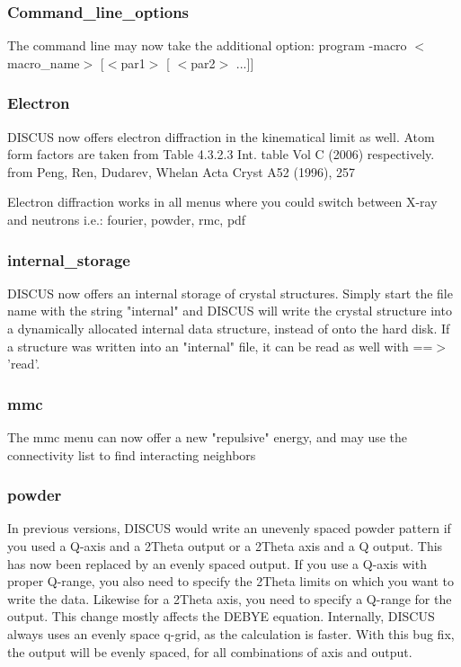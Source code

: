 \subsubsection{Command\_line\_options}
\par
The command line may now take the additional option: 
program -macro $ <$macro\_name$> $ [$ <$par1$> $ [ $ <$par2$> $ ...]] 
\subsubsection{Electron}
\par
DISCUS now offers electron diffraction in the kinematical limit as well. 
Atom form factors are taken from Table 4.3.2.3 Int. table Vol C (2006) 
respectively. from Peng, Ren, Dudarev, Whelan Acta Cryst A52 (1996), 257 
\par
Electron diffraction works in all menus where you could switch between 
X-ray and neutrons i.e.: fourier, powder, rmc, pdf 
\subsubsection{internal\_storage}
\par
DISCUS now offers an internal storage of crystal structures. 
Simply start the file name with the string "internal" and 
DISCUS will write the crystal structure into a dynamically 
allocated internal data structure, instead of onto the hard disk. 
If a structure was written into an "internal" file, it can be read 
as well with ==$> $ 'read'. 
\par
\subsubsection{mmc}
\par
The mmc menu can now offer a new "repulsive" energy, and may use 
the connectivity list to find interacting neighbors 
\subsubsection{powder}
\par
In previous versions, DISCUS would write an unevenly spaced powder 
pattern if you used a Q-axis and a 2Theta output or a 2Theta axis 
and a Q output. This has now been replaced by an evenly spaced 
output. 
If you use a Q-axis with proper Q-range, you also need to 
specify the 2Theta limits on which you want to write the data. 
Likewise for a 2Theta axis, you need to specify a Q-range for the 
output. 
This change mostly affects the DEBYE equation. Internally, 
DISCUS always uses an evenly space q-grid, as the calculation is 
faster. With this bug fix, the output will be evenly spaced, for 
all combinations of axis and output. 
